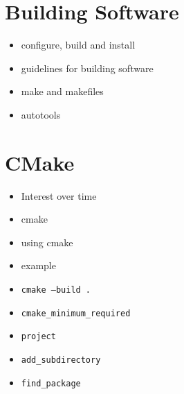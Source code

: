 \documentclass[8pt,a4paper,fleqn]{article}
\begin{document}
\begin{multicols}{2}
  \section{Building Software} %
  \label{sec:building_software}
  \begin{itemize}
    \item configure, build and install
    \item guidelines for building software
    \item make and makefiles
    \item autotools
  \end{itemize}

  \section{CMake} %
  \label{sec:cmake}
  \begin{itemize}
    \item Interest over time
    \item cmake
    \item using cmake
    \item example
    \item \texttt{cmake --build .}
    \item \texttt{cmake\_minimum\_required}
    \item \texttt{project}
    \item \texttt{add\_subdirectory}
    \item \texttt{find\_package}
  \end{itemize}


\end{multicols}
\end{document}
